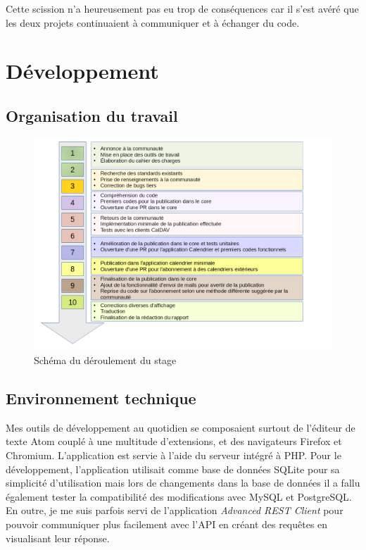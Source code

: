 \documentclass[10pt,a4paper, twoside]{report}
\begin{document}
	Cette scission n'a heureusement pas eu trop de conséquences car il s'est avéré que les deux projets continuaient à communiquer et à échanger du code.
	
	\chapter{Développement}
	\section{Organisation du travail}
	\begin{figure}[H]
		\centering
		\centerline{\includegraphics[width=1.45\textwidth]{images/deroulement.png}}
		\caption{Schéma du déroulement du stage}
		\label{normal_case}
	\end{figure}
	
	\section{Environnement technique}
	Mes outils de développement au quotidien se composaient surtout de l'éditeur de texte Atom couplé à une multitude d'extensions, et des navigateurs Firefox et Chromium. L'application est servie à l'aide du serveur intégré à PHP. Pour le développement, l'application utilisait comme base de données SQLite pour sa simplicité d'utilisation mais lors de changements dans la base de données il a fallu également tester la compatibilité des modifications avec MySQL et PostgreSQL.
	En outre, je me suis parfois servi de l'application \textit{Advanced REST Client} pour pouvoir communiquer plus facilement avec l'API en créant des requêtes en visualisant leur réponse.
	\\
	
\end{document}
